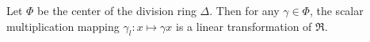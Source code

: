 Let $\Phi$ be the center of the division ring $\Delta$. Then for any $\gamma \in \Phi$, the scalar multiplication mapping $\gamma_l : x \mapsto \gamma x$ is a linear transformation of $\mathfrak{R}$.
